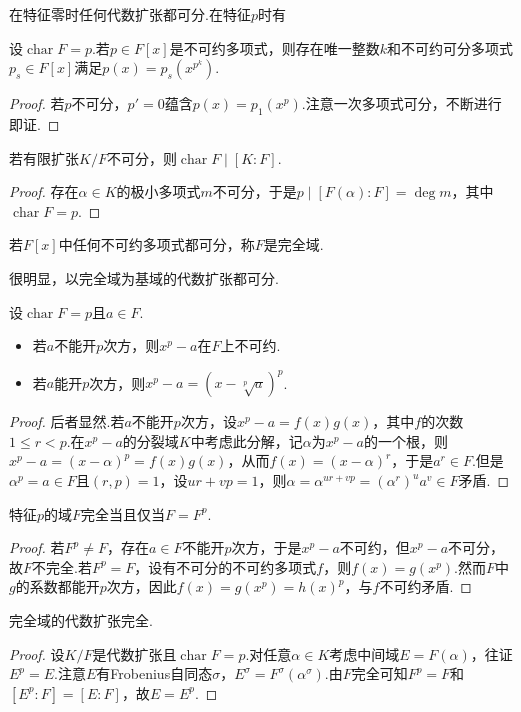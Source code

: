 在特征零时任何代数扩张都可分.在特征$p$时有
\begin{prop}
    设$\operatorname*{char}F=p$.若$p\in F[x]$是不可约多项式，则存在唯一整数$k$和不可约可分多项式$p_s\in F[x]$满足$p(x)=p_s(x^{p^k})$.
\end{prop}
\begin{proof}
    若$p$不可分，$p'=0$蕴含$p(x)=p_1(x^p)$.注意一次多项式可分，不断进行即证.
\end{proof}
\begin{cor*}
    若有限扩张$K/F$不可分，则$\operatorname*{char}F\mid[K:F]$.
\end{cor*}
\begin{proof}
    存在$\alpha\in K$的极小多项式$m$不可分，于是$p\mid [F(\alpha):F]=\deg m$，其中$\operatorname*{char}F=p$.
\end{proof}

\begin{definition}
    若$F[x]$中任何不可约多项式都可分，称$F$是{\heiti 完全域}.
\end{definition}

很明显，以完全域为基域的代数扩张都可分.
\begin{lemma*}
    设$\operatorname*{char}F=p$且$a\in F$.
    \begin{itemize}
        \item 若$a$不能开$p$次方，则$x^p-a$在$F$上不可约.
        \item 若$a$能开$p$次方，则$x^p-a=(x-\sqrt[p]{a})^p$.
    \end{itemize}
\end{lemma*}
\begin{proof}
    后者显然.若$a$不能开$p$次方，设$x^p-a=f(x)g(x)$，其中$f$的次数$1\le r<p$.在$x^p-a$的分裂域$K$中考虑此分解，记$\alpha$为$x^p-a$的一个根，则$x^p-a=(x-\alpha)^p=f(x)g(x)$，从而$f(x)=(x-\alpha)^r$，于是$a^r\in F$.但是$\alpha^p=a\in F$且$(r,p)=1$，设$ur+vp=1$，则$\alpha=\alpha^{ur+vp}=(\alpha^r)^ua^v\in F$矛盾.
\end{proof}
\begin{prop}
    特征$p$的域$F$完全当且仅当$F=F^p$.
\end{prop}
\begin{proof}
    若$F^p\ne F$，存在$a\in F$不能开$p$次方，于是$x^p-a$不可约，但$x^p-a$不可分，故$F$不完全.若$F^p=F$，设有不可分的不可约多项式$f$，则$f(x)=g(x^p)$.然而$F$中$g$的系数都能开$p$次方，因此$f(x)=g(x^p)=h(x)^p$，与$f$不可约矛盾.
\end{proof}
\begin{cor*}
    完全域的代数扩张完全.
\end{cor*}
\begin{proof}
    设$K/F$是代数扩张且$\operatorname*{char}F=p$.对任意$\alpha\in K$考虑中间域$E=F(\alpha)$，往证$E^p=E$.注意$E$有Frobenius自同态$\sigma$，$E^\sigma=F^\sigma(\alpha^\sigma)$.由$F$完全可知$F^p=F$和$[E^p:F]=[E:F]$，故$E=E^p$.
\end{proof}

